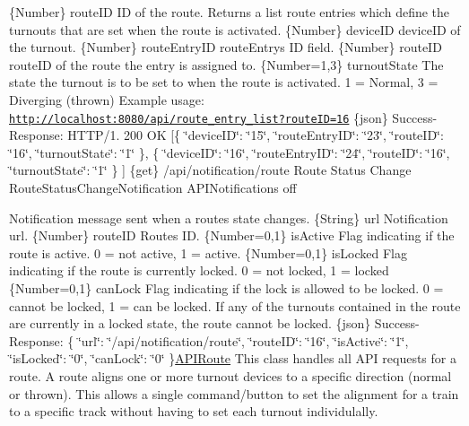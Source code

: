 \{Number\} route\+ID ID of the route.  Returns a list route entries which define the turnouts that are set when the route is activated.  \{Number\} device\+ID device\+ID of the turnout.  \{Number\} route\+Entry\+ID route\+Entry\textquotesingle{}s ID field.  \{Number\} route\+ID route\+ID of the route the entry is assigned to.  \{Number=1,3\} turnout\+State The state the turnout is to be set to when the route is activated. 1 = Normal, 3 = Diverging (thrown)  Example usage\+: \href{http://localhost:8080/api/route_entry_list?routeID=16}{\tt http\+://localhost\+:8080/api/route\+\_\+entry\+\_\+list?route\+I\+D=16}  \{json\} Success-\/\+Response\+: H\+T\+T\+P/1. 200 OK \mbox{[}\{ \char`\"{}device\+I\+D\char`\"{}\+: \char`\"{}15\char`\"{}, \char`\"{}route\+Entry\+I\+D\char`\"{}\+: \char`\"{}23\char`\"{}, \char`\"{}route\+I\+D\char`\"{}\+: \char`\"{}16\char`\"{}, \char`\"{}turnout\+State\char`\"{}\+: \char`\"{}1\char`\"{} \}, \{ \char`\"{}device\+I\+D\char`\"{}\+: \char`\"{}16\char`\"{}, \char`\"{}route\+Entry\+I\+D\char`\"{}\+: \char`\"{}24\char`\"{}, \char`\"{}route\+I\+D\char`\"{}\+: \char`\"{}16\char`\"{}, \char`\"{}turnout\+State\char`\"{}\+: \char`\"{}1\char`\"{} \} \mbox{]}  \{get\} /api/notification/route Route Status Change  Route\+Status\+Change\+Notification  A\+P\+I\+Notifications  off

Notification message sent when a route\textquotesingle{}s state changes.  \{String\} url Notification url.  \{Number\} route\+ID Route\textquotesingle{}s ID.  \{Number=0,1\} is\+Active Flag indicating if the route is active. 0 = not active, 1 = active.  \{Number=0,1\} is\+Locked Flag indicating if the route is currently locked. 0 = not locked, 1 = locked  \{Number=0,1\} can\+Lock Flag indicating if the lock is allowed to be locked. 0 = cannot be locked, 1 = can be locked. If any of the turnouts contained in the route are currently in a locked state, the route cannot be locked.  \{json\} Success-\/\+Response\+: \{ \char`\"{}url\char`\"{}\+: \char`\"{}/api/notification/route\char`\"{}, \char`\"{}route\+I\+D\char`\"{}\+: \char`\"{}16\char`\"{}, \char`\"{}is\+Active\char`\"{}\+: \char`\"{}1\char`\"{}, \char`\"{}is\+Locked\char`\"{}\+: \char`\"{}0\char`\"{}, \char`\"{}can\+Lock\char`\"{}\+: \char`\"{}0\char`\"{} \}\hyperlink{class_a_p_i_route}{A\+P\+I\+Route} This class handles all A\+PI requests for a route. A route aligns one or more turnout devices to a specific direction (normal or thrown). This allows a single command/button to set the alignment for a train to a specific track without having to set each turnout individulally. 

